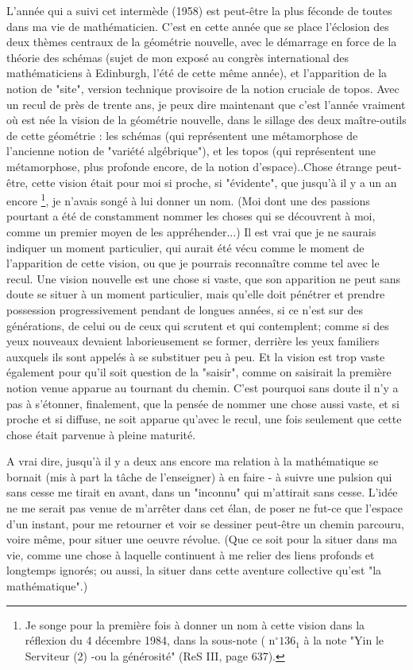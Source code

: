 {L'année qui a suivi cet intermède (1958) est peut-être la plus féconde de toutes dans ma vie de mathématicien. C'est en cette année que se place l'éclosion des deux thèmes centraux de la géométrie nouvelle, avec le démarrage en force de la théorie des schémas (sujet de mon exposé au congrès international des mathématiciens à Edinburgh, l'été de cette même année), et l'apparition de la notion de "site", version technique provisoire de la notion cruciale de topos. Avec un recul de près de trente ans, je peux dire maintenant que c'est l'année vraiment où est née la vision de la géométrie nouvelle, dans le sillage des deux maître-outils de cette géométrie : les schémas (qui représentent une métamorphose de l'ancienne notion de "variété algébrique"), et les topos (qui représentent une métamorphose, plus profonde encore, de la notion d'espace).}.Chose étrange peut-être, cette vision était pour moi si proche, si "évidente", que jusqu'à il y a un an encore \footnote{Je songe pour la première fois à donner un nom à cette vision dans la réflexion du 4 décembre 1984, dans la sous-note ( $\mathrm{n}^{\circ} 136_{1}$ à la note "Yin le Serviteur (2) -ou la générosité" (ReS III, page 637).}, je n'avais songé à lui donner un nom. (Moi dont une des passions pourtant a été de constamment nommer les choses qui se découvrent à moi, comme un premier moyen de les appréhender...) Il est vrai que je ne saurais indiquer un moment particulier, qui aurait été vécu comme le moment de l'apparition de cette vision, ou que je pourrais reconnaître comme tel avec le recul. Une vision nouvelle est une chose si vaste, que son apparition ne peut sans doute se situer à un moment particulier, mais qu'elle doit pénétrer et prendre possession progressivement pendant de longues années, si ce n'est sur des générations, de celui ou de ceux qui scrutent et qui contemplent; comme si des yeux nouveaux devaient laborieusement se former, derrière les yeux familiers auxquels ils sont appelés à se substituer peu à peu. Et la vision est trop vaste également pour qu'il soit question de la "saisir", comme on saisirait la première notion venue apparue au tournant du chemin. C'est pourquoi sans doute il n'y a pas à s'étonner, finalement, que la pensée de nommer une chose aussi vaste, et si proche et si diffuse, ne soit apparue qu'avec le recul, une fois seulement que cette chose était parvenue à pleine maturité.

A vrai dire, jusqu'à il y a deux ans encore ma relation à la mathématique se bornait (mis à part la tâche de l'enseigner) à en faire - à suivre une pulsion qui sans cesse me tirait en avant, dans un "inconnu" qui m'attirait sans cesse. L'idée ne me serait pas venue de m'arrêter dans cet élan, de poser ne fut-ce que l'espace d'un instant, pour me retourner et voir se dessiner peut-être un chemin parcouru, voire même, pour situer une oeuvre révolue. (Que ce soit pour la situer dans ma vie, comme une chose à laquelle continuent à me relier des liens profonds et longtemps ignorés; ou aussi, la situer dans cette aventure collective qu'est "la mathématique".)

